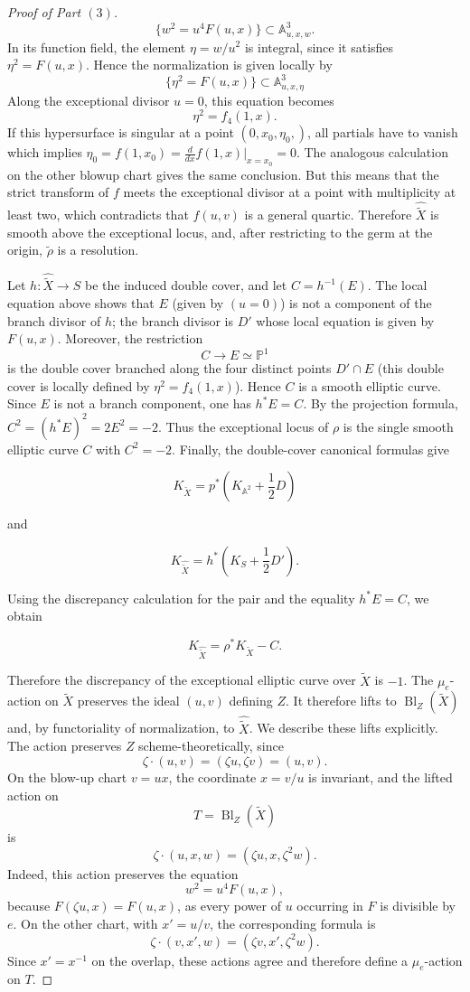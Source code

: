 \documentclass[11pt,twoside]{amsart}
\theoremstyle{plain}
\numberwithin{equation}{section}
\theoremstyle{definition}
\begin{document}
\begin{proof}[Proof of Part $(3)$]
$$
\{w^2=u^4F(u,x)\} \subset \mathbb{A}^3_{u,x,w}.
$$
In its function field, the element $\eta=w/u^2$ is integral, since it satisfies $\eta^2=F(u,x)$. Hence the normalization is given locally by
$$
\{\eta^2=F(u,x)\} \subset \mathbb{A}^3_{u,x,\eta}
$$
Along the exceptional divisor $u=0$, this equation becomes
$$
\eta^2=f_4(1,x).
$$
If this hypersurface is singular at a point $(0,x_0, \eta_0, )$, all partials have to vanish which implies $\eta_0 = f(1,x_0) = \frac{d}{dx}f(1,x)|_{x=x_0} = 0$. The analogous calculation on the other blowup chart gives the same conclusion. But this means that the strict transform of $f$ meets the exceptional divisor at a point with multiplicity at least two, which contradicts that $f(u,v)$ is a general quartic.
Therefore $\widehat{\widetilde X}$ is smooth above the exceptional locus, and, after restricting to the germ at the origin, $\widetilde{\rho}$ is a resolution.

Let $h:\widehat{\widetilde X}\to S$ be the induced double cover, and let $C=h^{-1}(E)$. The local equation above shows that $E$ (given by $(u = 0)$) is not a component of the branch divisor of $h$; the branch divisor is $D'$ whose local equation is given by $F(u,x)$. Moreover, the restriction
$$
C\longrightarrow E\simeq\mathbb P^1
$$
is the double cover branched along the four distinct points $D'\cap E$ (this double cover is locally defined by $\eta^2=f_4(1,x)$). Hence $C$ is a smooth elliptic curve.
Since $E$ is not a branch component, one has $h^*E=C$. By the projection formula,
$C^2=(h^*E)^2=2E^2=-2.$ Thus the exceptional locus of $\rho$ is the single smooth elliptic curve $C$ with $C^2=-2$.
Finally, the double-cover canonical formulas give

$$
K_{\widetilde X} =
p^*\left(K_{\mathbb A^2}+\frac12D\right)
$$

and

$$
K_{\widehat{\widetilde X}} =
h^*\left(K_S+\frac12D'\right).
$$

Using the discrepancy calculation for the pair and the equality $h^*E=C$, we obtain

$$
K_{\widehat{\widetilde X}}=
\rho^*K_{\widetilde X}-C.
$$

Therefore the discrepancy of the exceptional elliptic curve over $\widetilde X$ is $-1$.
The $\mu_e$-action on $\widetilde X$ preserves the ideal $(u,v)$ defining $Z$. It therefore lifts to $\operatorname{Bl}_Z(\widetilde X)$ and, by functoriality of normalization, to $\widehat{\widetilde X}$. 
\begingroup
\color{blue}
We describe these lifts explicitly. The action preserves $Z$ scheme-theoretically, since
\[
\zeta\cdot(u,v)=(\zeta u,\zeta v)=(u,v).
\]
On the blow-up chart $v=ux$, the coordinate $x=v/u$ is invariant, and the lifted action on
\[
T=\operatorname{Bl}_Z(\widetilde X)
\]
is
\[
\zeta\cdot(u,x,w)=(\zeta u,x,\zeta^2w).
\]
Indeed, this action preserves the equation
\[
w^2=u^4F(u,x),
\]
because $F(\zeta u,x)=F(u,x)$, as every power of $u$ occurring in $F$ is divisible by $e$. On the other chart, with $x'=u/v$, the corresponding formula is
\[
\zeta\cdot(v,x',w)=(\zeta v,x',\zeta^2w).
\]
Since $x'=x^{-1}$ on the overlap, these actions agree and therefore define a $\mu_e$-action on $T$.


\end{proof}
\end{document}
